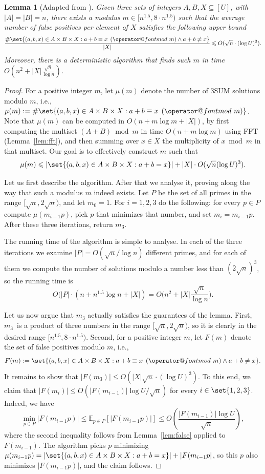 \documentclass[10pt,a4paper]{article}
\makeatletter
\newtheorem{lemma}{Lemma}[section]
\newcommand{\E}{\mathbb{E}}
\newcommand{\tpmod}[1]{\mkern 8mu({\operator@font mod}\mkern 6mu#1)}
\makeatother
\begin{document}
\begin{lemma}[Adapted from \cite{FischerK024}]
\label{lem:modulusselection}
Given three sets of integers $A, B, X \subseteq [U]$, with $|A|=|B|=n$, there exists a modulus $m \in [n^{1.5}, 8\cdot n^{1.5})$ such that the average number of false positives per element of $X$ satisfies the following upper bound
\[\frac{\#\set{(a,b,x) \in A \times B \times X : a + b \equiv x \tpmod{m} \land a + b \neq x}}{|X|} \leqslant O(\sqrt{n} \cdot (\log U)^3).\]
Moreover, there is a deterministic algorithm that finds such $m$ in time $O(n^2 + |X|\frac{\sqrt{n}}{\log n})$.
\end{lemma}

\begin{proof}
For a positive integer $m$, let $\mu(m)$ denote the number of 3SUM solutions modulo $m$, i.e.,
$\mu(m) := \#\set{(a,b,x) \in A \times B \times X : a + b \equiv x \tpmod{m}}$. 
Note that $\mu(m)$ can be computed in $O(n + m \log m + |X|)$, by first computing the multiset $(A+B) \bmod m$ in time $O(n + m \log m)$ using FFT (Lemma~\ref{lem:fft}), and then summing over $x \in X$ the multiplicity of $x \bmod m$ in that multiset.
Our goal is to effectively construct $m$ such that
\[\mu(m) \leqslant |\set{(a,b,x) \in A \times B \times X : a + b = x}| + |X| \cdot O(\sqrt{n} (\log U)^3).\]

Let us first describe the algorithm. After that we analyse it, proving along the way that such a modulus $m$ indeed exists. Let $P$ be the set of all primes in the range $[\sqrt{n}, 2\sqrt{n})$, and let $m_0 = 1$. For $i=1,2,3$ do the following: for every $p \in P$ compute $\mu(m_{i-1}p)$, pick $p$ that minimizes that number, and set $m_i = m_{i-1}p$. After these three iterations, return $m_3$.

The running time of the algorithm is simple to analyse. In each of the three iterations we examine $|P| = O(\sqrt{n} / \log n)$ different primes, and for each of them we compute the number of solutions modulo a number less than $(2\sqrt{n})^3$, so the running time is 
\[O(|P|\cdot(n + n^{1.5}\log n + |X|) = O\big(n^2+|X|\frac{\sqrt{n}}{\log n}\big).\]

Let us now argue that $m_3$ actually satisfies the guarantees of the lemma.
First, $m_3$~is a product of three numbers in the range $[\sqrt{n}, 2\sqrt{n})$, so it is clearly in the desired range $[n^{1.5}, 8 \cdot n^{1.5})$.
Second, for a positive integer $m$, let $F(m)$ denote the set of false positives modulo $m$, i.e.,
\[F(m) := \set{(a,b,x) \in A \times B \times X : a + b \equiv x \tpmod{m} \land a + b \neq x}.\]
It remains to show that $|F(m_3)| \leqslant O(|X|\sqrt{n}\cdot(\log U)^3)$.
To this end, we claim that $|F(m_i)| \leqslant O(|F(m_{i-1})| \log U / \sqrt{n})$ for every $i\in\set{1,2,3}$. Indeed, we have
\[ \min_{p \in P} |F(m_{i-1}p)|  \leqslant \E_{p \in P}[|F(m_{i-1}p)|] \leqslant O\left(\frac{|F(m_{i-1})| \log U}{\sqrt{n}}\right),\]
where the second inequality follows from Lemma~\ref{lem:false} applied to $F(m_{i-1})$. The algorithm picks $p$ minimizing $\mu(m_{i-1}p) = |\set{(a,b,x) \in A \times B \times X : a + b = x}| + |F(m_{i-1}p|$, so this $p$ also minimizes $|F(m_{i-1}p)|$, and the claim follows.


\end{proof}
\end{document}
